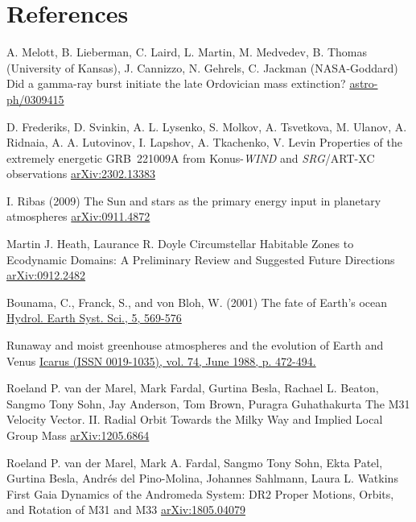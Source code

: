 \documentclass[aspectratio=169]{beamer}
\begin{document}
\section{References}
\begin{frame}[allowframebreaks]
\footnotesize{

\begin{thebibliography}{99}
%
A. Melott, B. Lieberman, C. Laird, L. Martin, M. Medvedev, B. Thomas (University of Kansas), J. Cannizzo, N. Gehrels, C. Jackman (NASA-Goddard) 
\newblock Did a gamma-ray burst initiate the late Ordovician mass extinction?
\newblock \href{http://arxiv.org/abs/astro-ph/0309415}{astro-ph/0309415}

%
D. Frederiks, D. Svinkin, A. L. Lysenko, S. Molkov, A. Tsvetkova, M. Ulanov, A. Ridnaia, A. A. Lutovinov, I. Lapshov, A. Tkachenko, V. Levin
\newblock Properties of the extremely energetic GRB~221009A from Konus-\textit{WIND} and \textit{SRG}/ART-XC observations
\newblock \href{http://arxiv.org/abs/2302.13383}{arXiv:2302.13383}

I. Ribas (2009)
\newblock The Sun and stars as the primary energy input in planetary atmospheres
\newblock \href{http://arxiv.org/abs/0911.4872}{arXiv:0911.4872}

Martin J. Heath, Laurance R. Doyle
\newblock Circumstellar Habitable Zones to Ecodynamic Domains: A Preliminary Review and Suggested Future Directions
\newblock \href{http://arxiv.org/abs/0912.2482}{arXiv:0912.2482}

Bounama, C., Franck, S., and von Bloh, W. (2001)
\newblock The fate of Earth's ocean
\newblock \href{http://doi.org/10.1016/0019-1035(88)90116-9}{Hydrol. Earth Syst. Sci., 5, 569-576}

\newblock Runaway and moist greenhouse atmospheres and the evolution of Earth and Venus
\newblock \href{https://doi.org/10.1016/0019-1035(88)90116-9}{Icarus (ISSN 0019-1035), vol. 74, June 1988, p. 472-494.}

Roeland P. van der Marel, Mark Fardal, Gurtina Besla, Rachael L. Beaton, Sangmo Tony Sohn, Jay Anderson, Tom Brown, Puragra Guhathakurta
\newblock The M31 Velocity Vector. II. Radial Orbit Towards the Milky Way and Implied Local Group Mass
\newblock \href{http://arxiv.org/abs/1205.6863}{arXiv:1205.6864}

Roeland P. van der Marel, Mark A. Fardal, Sangmo Tony Sohn, Ekta Patel, Gurtina Besla, Andrés del Pino-Molina, Johannes Sahlmann, Laura L. Watkins
\newblock First Gaia Dynamics of the Andromeda System: DR2 Proper Motions, Orbits, and Rotation of M31 and M33
\newblock \href{http://arxiv.org/abs/1805.04079}{arXiv:1805.04079}

\end{thebibliography}
}
\end{frame}
\end{document}
